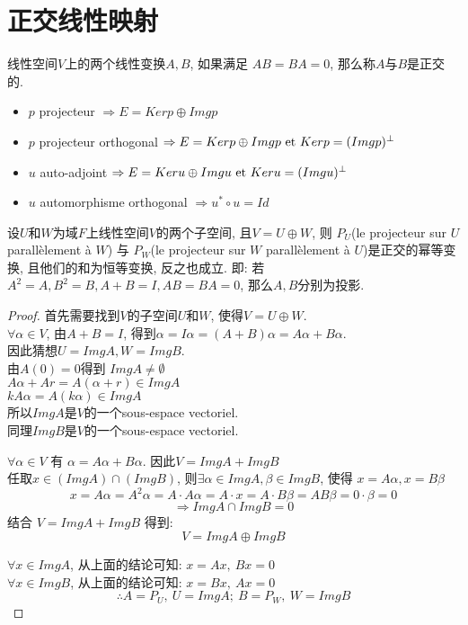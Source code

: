 \section{正交线性映射}
\begin{definition}
线性空间$V$上的两个线性变换$A, B$, 如果满足 $AB = BA = 0$, 那么称$A$与$B$是正交的.
\end{definition}

\begin{itemize}
\item $p$ projecteur $\Rightarrow E = Ker p \oplus Img p$
\item $p$ projecteur orthogonal $\Rightarrow E = Ker p \oplus Img p \textrm{\ et } Ker p = (Img p)^{\perp}$
\item $u$ auto-adjoint $\Rightarrow E = Ker u \oplus Img u \textrm{\ et } Ker u = (Img u)^{\perp}$
\item $u$ automorphisme orthogonal $\Rightarrow u^* \circ u = Id$
\end{itemize}

\begin{lemma}
设$U$和$W$为域$F$上线性空间$V$的两个子空间, 且$V = U \oplus W$, 则
$P_U$(le projecteur sur $U$ parall\`element \`a $W$) 与
$P_W$(le projecteur sur $W$ parall\`element \`a $U$)是正交的幂等变换, 且他们的和为恒等变换, 反之也成立.
即: 若$A^2 = A, B^2 = B, A + B = I, AB = BA = 0$, 那么$A, B$分别为投影.
\end{lemma}
\begin{proof}
首先需要找到$V$的子空间$U$和$W$, 使得$V = U \oplus W$. \\
$\forall \alpha \in V$, 由$A + B = I$, 得到$\alpha  = I \alpha = (A + B) \alpha = A \alpha + B \alpha$. \\
因此猜想$U = ImgA, W = ImgB$. \\
由$A(0) = 0$得到 $Img A \neq \emptyset$ \\
$A \alpha + A r = A(\alpha + r) \in Img A$ \\
$k A \alpha = A(k \alpha) \in Img A$ \\
所以$ImgA$是$V$的一个sous-espace vectoriel. \\
同理$ImgB$是$V$的一个sous-espace vectoriel.

$\forall \alpha \in V$ 有 $\alpha  = A \alpha + B \alpha$. 因此$V = Img A + Img B$ \\
任取$x \in (Img A) \cap (Img B)$, 则$\exists \alpha \in Img A, \beta \in Img B$, 使得 $x = A \alpha, x = B \beta$ \\
$$x = A \alpha = A^2 \alpha = A \cdot A \alpha = A \cdot x = A \cdot B \beta = AB \beta = 0 \cdot \beta = 0 $$
$$\Rightarrow Img A \cap Img B = 0$$
结合 $V = Img A + Img B$ 得到:
$$V = Img A \oplus Img B$$

$\forall x \in Img A$, 从上面的结论可知: $x = A x,~ B x = 0$ \\
$\forall x \in Img B$, 从上面的结论可知: $x = B x,~ A x = 0$ \\
$$\therefore A = P_U,~ U = Img A;~ B = P_W,~ W = Img B$$
\end{proof}


